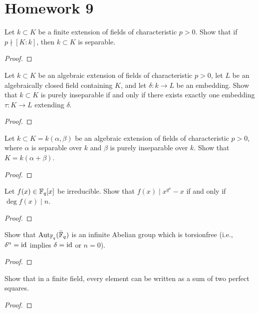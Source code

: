 \chapter{Homework 9}
\begin{problem}
Let $k\subset K$ be a finite extension of fields of characteristic
$p>0$. Show that if $p\nmid [K:k]$, then $k\subset K$ is separable.
\end{problem}
\begin{proof}
\end{proof}

\begin{problem}
Let $k\subset K$ be an algebraic extension of fields of characteristic
$p>0$, let $L$ be an algebraically closed field containing $K$, and let
$\delta\colon k\to L$ be an embedding. Show that $k\subset K$ is purely
inseparable if and only if there exists exactly one embedding $\tau\colon
K\to L$ extending $\delta$.
\end{problem}
\begin{proof}
\end{proof}

\begin{problem}
Let $k\subset K=k(\alpha,\beta)$ be an algebraic extension of fields of
characteristic $p>0$, where $\alpha$ is separable over $k$ and $\beta$ is
purely inseparable over $k$. Show that $K=k(\alpha+\beta)$.
\end{problem}
\begin{proof}
\end{proof}

\begin{problem}
Let $f(x)\in\mathbb{F}_q[x]$ be irreducible. Show that $f(x)\mid x^{q^n}-x$ if
and only if $\deg f(x)\mid n$.
\end{problem}
\begin{proof}
\end{proof}

\begin{problem}
Show that $\operatorname{Aut}_{\mathbb{F}_q}(\bar{\mathbb{F}}_q)$ is an infinite Abelian group
which is torsionfree (i.e., $\delta^n=\operatorname{id}$ implies $\delta=\operatorname{id}$ or $n=0$).
\end{problem}
\begin{proof}
\end{proof}

\begin{problem}
Show that in a finite field, every element can be written as a sum of two
perfect squares.
\end{problem}
\begin{proof}
\end{proof}

